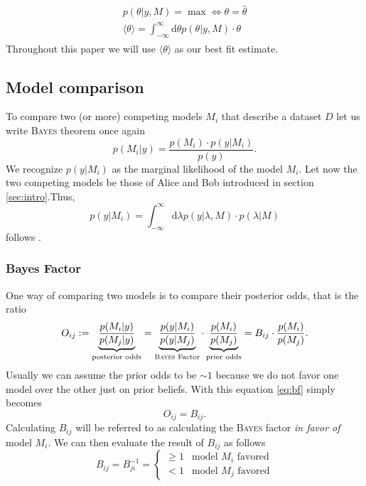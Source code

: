 \documentclass[%
 reprint,
 amsmath,amssymb,
 aps,
]{revtex4-1}
\begin{document}
\begin{align}
	\begin{split}
		p(\theta|y,M)=\max \Leftrightarrow \theta=\hat{\theta}\\
		\langle\theta\rangle=\int_{-\infty}^{\infty}\text{d}\theta  p(\theta|y,M)\cdot\theta
	\end{split}
\end{align}
Throughout this paper we will use $\langle\theta\rangle$ as our best fit estimate. \cite{sivia}

\subsection{Model comparison}\label{sec:Model_comparison}
\noindent To compare two (or more) competing models $M_i$ that describe a dataset $D$ let us write \textsc{Bayes} theorem once again
\begin{equation}
	p(M_i|y)=\frac{p(M_i)\cdot p(y|M_i)}{p(y)}.
\end{equation}
We recognize $p(y|M_i)$ as the marginal likelihood of the model $M_i$. Let now  the two competing models be those of Alice and Bob introduced in section \eqref{sec:intro}.Thus, $$p(y|M_i)=\int_{-\infty}^{\infty}\text{d}\lambda p(y|\lambda, M)\cdot p(\lambda|M)$$
follows \cite[Chap. 3]{sivia}.
\subsubsection{\textbf{Bayes Factor}}
One way of comparing two models is to compare their posterior odds, that is the ratio \cite{Trotta_2008} \begin{equation}\label{eq:bf}O_{ij}:=\underbrace{\frac{p(M_i|y)}{p(M_j|y)}}_{\text{posterior odds}}=\underbrace{\frac{p(y|M_i)}{p(y|M_j)}}_{\text{\textsc{Bayes} Factor}}\cdot\underbrace{\frac{p(M_i)}{p(M_j)}}_{\text{prior odds}}=B_{ij}\cdot\frac{p(M_i)}{p(M_j)}.\end{equation}
Usually we can assume the prior odds to be $\sim 1$ because we do not favor one model over the other just on prior beliefs. With this equation \eqref{eq:bf} simply becomes $$O_{ij}=B_{ij}.$$
Calculating $B_{ij}$ will be referred to as calculating the \textsc{Bayes} factor \emph{in favor of} model $M_i$. We can then evaluate the result of $B_{ij}$ as follows 
\begin{equation*}
	B_{ij}=B_{ji}^{-1}=\begin{cases} \geq 1 & \text{model } M_i \text{ favored}\\
	 <1 & \text{model } M_j \text{ favored}
	\end{cases}
\end{equation*}
\end{document}
